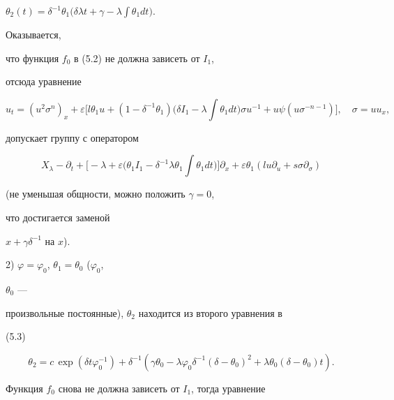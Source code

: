 $\theta_2(t)=\delta^{-1}\theta_1\bigl(\delta\lambda t+


\gamma-\lambda\int\theta_1dt\bigr)$.


Оказывается,


что функция $f_0$ в (5.2) не должна зависеть от $I_1$,


отсюда уравнение


\begin{equation}


u_t=(u^2\sigma^n)_x+\varepsilon\biggl[l\theta_1u+


(1-\delta^{-1}\theta_1)


\biggl(\delta I_1-\lambda\int\theta_1dt\biggr)\sigma u^{-1}+


u\psi(u\sigma^{-n-1})\biggr],\quad \sigma=uu_x, \tag{5.4}


\end{equation}


допускает группу с оператором


\begin{equation}


X_\lambda-\partial_t+\biggl[-\lambda+\varepsilon\biggl(


\theta_1I_1-\delta^{-1}\lambda\theta_1\int\theta_1dt


\biggr)\biggr]\partial_x+\varepsilon\theta_1(lu\partial_u


+s\sigma\partial_\sigma)\tag{5.5}


\end{equation}


(не уменьшая общности, можно положить $\gamma=0$,


что достигается заменой


$x+\gamma\delta^{-1}$ на $x$).





2) $\varphi=\varphi_0$, $\theta_1=\theta_0$ ($\varphi_0$,


$\theta_0$ ---


произвольные постоянные), $\theta_2$ находится из второго уравнения в


(5.3)


$$


\theta_2=c\,\exp(\delta t\varphi^{-1}_0)+\delta^{-1}


(\gamma\theta_0-\lambda\varphi_0\delta^{-1}


(\delta-\theta_0)^2+\lambda\theta_0(\delta-\theta_0)t).


$$


Функция $f_0$ снова не должна зависеть от $I_1$, тогда уравнение


